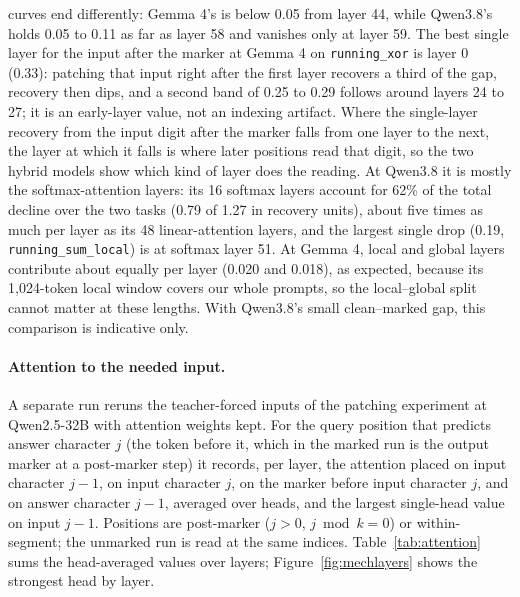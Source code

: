 \documentclass[10pt]{article} %
\newcommand{\task}[1]{\texttt{#1}}
\begin{document}
curves end differently: Gemma 4's is below 0.05 from layer 44, while Qwen3.8's holds 0.05 to 0.11 as far as layer 58 and vanishes only at layer 59. The best single layer for the input after the marker at Gemma 4 on \task{running\_xor} is layer 0 (0.33): patching that input right after the first layer recovers a third of the gap, recovery then dips, and a second band of 0.25 to 0.29 follows around layers 24 to 27; it is an early-layer value, not an indexing artifact. Where the single-layer recovery from the input digit after the marker falls from one layer to the next, the layer at which it falls is where later positions read that digit, so the two hybrid models show which kind of layer does the reading. At Qwen3.8 it is mostly the softmax-attention layers: its 16 softmax layers account for 62\% of the total decline over the two tasks (0.79 of 1.27 in recovery units), about five times as much per layer as its 48 linear-attention layers, and the largest single drop (0.19, \task{running\_sum\_local}) is at softmax layer 51. At Gemma 4, local and global layers contribute about equally per layer (0.020 and 0.018), as expected, because its 1,024-token local window covers our whole prompts, so the local--global split cannot matter at these lengths. With Qwen3.8's small clean--marked gap, this comparison is indicative only.

\paragraph{Attention to the needed input.} A separate run reruns the teacher-forced inputs of the patching experiment at Qwen2.5-32B with attention weights kept. For the query position that predicts answer character $j$ (the token before it, which in the marked run is the output marker at a post-marker step) it records, per layer, the attention placed on input character $j-1$, on input character $j$, on the marker before input character $j$, and on answer character $j-1$, averaged over heads, and the largest single-head value on input $j-1$. Positions are post-marker ($j > 0$, $j \bmod k = 0$) or within-segment; the unmarked run is read at the same indices. Table~\ref{tab:attention} sums the head-averaged values over layers; Figure~\ref{fig:mechlayers} shows the strongest head by layer.
\end{document}
